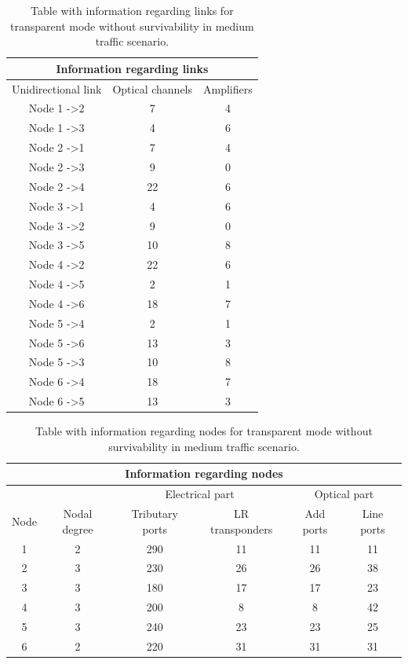 \begin{table}[H]
	\centering
	\begin{tabular}{|c|c|c|}
		\hline
		\multicolumn{3}{|c|}{\textbf{Information regarding links}} \\ \hline
		Unidirectional link & Optical channels & Amplifiers \\ \hline
		Node 1 -\textgreater 2 & 7 & 4 \\ \hline
		Node 1 -\textgreater 3 & 4 & 6 \\ \hline
		Node 2 -\textgreater 1 & 7 & 4 \\ \hline
		Node 2 -\textgreater 3 & 9 & 0 \\ \hline
		Node 2 -\textgreater 4 & 22 & 6 \\ \hline
		Node 3 -\textgreater 1 & 4 & 6 \\ \hline
		Node 3 -\textgreater 2 & 9 & 0 \\ \hline
		Node 3 -\textgreater 5 & 10 & 8 \\ \hline
		Node 4 -\textgreater 2 & 22 & 6 \\ \hline
		Node 4 -\textgreater 5 & 2 & 1 \\ \hline
		Node 4 -\textgreater 6 & 18 & 7 \\ \hline
		Node 5 -\textgreater 4 & 2 & 1 \\ \hline
		Node 5 -\textgreater 6 & 13 & 3 \\ \hline
		Node 5 -\textgreater 3 & 10 & 8 \\ \hline
		Node 6 -\textgreater 4 & 18 & 7 \\ \hline
		Node 6 -\textgreater 5 & 13 & 3 \\ \hline
	\end{tabular}
	\caption{Table with information regarding links for transparent mode without survivability in medium traffic scenario.}
\end{table}

\begin{table}[H]
	\centering
	\begin{tabular}{|c|c|c|c|c|c|}
		\hline
		\multicolumn{6}{|c|}{\textbf{Information regarding nodes}} \\ \hline
		\multicolumn{2}{|c|}{} & \multicolumn{2}{c|}{Electrical part} & \multicolumn{2}{c|}{Optical part} \\ \hline
		Node & Nodal degree & Tributary ports & LR transponders & Add ports & Line ports \\ \hline
		1 & 2 & 290 & 11 & 11 & 11 \\ \hline
		2 & 3 & 230 & 26 & 26 & 38 \\ \hline
		3 & 3 & 180 & 17 & 17 & 23 \\ \hline
		4 & 3 & 200 & 8 & 8 & 42 \\ \hline
		5 & 3 & 240 & 23 & 23 & 25 \\ \hline
		6 & 2 & 220 & 31 & 31 & 31 \\ \hline
	\end{tabular}
	\caption{Table with information regarding nodes for transparent mode without survivability in medium traffic scenario.}
\end{table}

